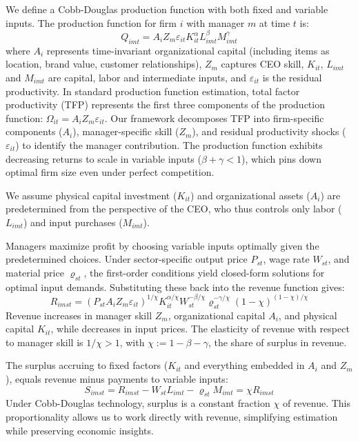\documentclass[11pt,a4paper]{article}
\begin{document}
We define a Cobb-Douglas production function with both fixed and variable inputs. The production function for firm $i$ with manager $m$ at time $t$ is:
\begin{equation}\label{eq:production}
Q_{imt} = A_i Z_{m} \varepsilon_{it} K_{it}^\alpha L_{imt}^{\beta} M_{imt}^{\gamma}
\end{equation}
where $A_i$ represents time-invariant organizational capital (including items as location, brand value, customer relationships), $Z_m$ captures CEO skill, $K_{it}$, $L_{imt}$ and $M_{imt}$ are capital, labor and intermediate inputs, and $\varepsilon_{it}$ is the residual productivity. In standard production function estimation, total factor productivity (TFP) represents the first three components of the production function: $\Omega_{it} = A_i Z_m \varepsilon_{it}$. Our framework decomposes TFP into firm-specific components ($A_i$), manager-specific skill ($Z_m$), and residual productivity shocks ($\varepsilon_{it}$) to identify the manager contribution. The production function exhibits decreasing returns to scale in variable inputs ($\beta + \gamma < 1$), which pins down optimal firm size even under perfect competition. 

We assume physical capital investment ($K_{it}$) and organizational assets ($A_i$) are predetermined from the perspective of the CEO, who thus controls only labor ($L_{imt}$) and input purchases ($M_{imt}$). 

Managers maximize profit by choosing variable inputs optimally given the predetermined choices. Under sector-specific output price $P_{st}$, wage rate $W_{st}$, and material price $\varrho_{st}$, the first-order conditions yield closed-form solutions for optimal input demands. Substituting these back into the revenue function gives:
\begin{equation}\label{eq:revenue}
R_{imst} = (P_{st}A_i Z_m \varepsilon_{it})^{1/\chi}
K_{it}^{\alpha/\chi}
W_{st}^{-\beta/\chi}
\varrho_{st}^{-\gamma/\chi}
(1-\chi)^{(1-\chi)/\chi}
\end{equation}
Revenue increases in manager skill $Z_m$, organizational capital $A_i$, and physical capital $K_{it}$, while decreases in input prices. The elasticity of revenue with respect to manager skill is $1/\chi > 1$, with $\chi := 1 - \beta - \gamma$, the share of surplus in revenue. 

The surplus accruing to fixed factors ($K_{it}$ and everything embedded in $A_i$ and $Z_m$), equals revenue minus payments to variable inputs:
\begin{equation}\label{eq:surplus}
S_{imst} = R_{imst} - W_{st}L_{imt} - \varrho_{st}M_{imt} = \chi R_{imst}
\end{equation}
Under Cobb-Douglas technology, surplus is a constant fraction $\chi$ of revenue. This proportionality allows us to work directly with revenue, simplifying estimation while preserving economic insights. 
\end{document}
